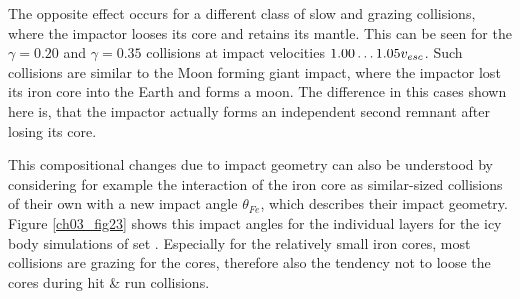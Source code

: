 The opposite effect occurs for a different class of slow and grazing collisions, where the impactor looses its core and retains its mantle. This can be seen for the $\gamma = 0.20$ and $\gamma = 0.35$ collisions at impact velocities $1.00 \dots 1.05 v_{esc}$. Such collisions are similar to the Moon forming giant impact, where the impactor lost its iron core into the Earth and forms a moon. The difference in this cases shown here is, that the impactor actually forms an independent second remnant after losing its core. 

This compositional changes due to impact geometry can also be understood by considering for example the interaction of the iron core as similar-sized collisions of their own with a new impact angle $\theta_{Fe}$, which describes their impact geometry. Figure \ref{ch03_fig23} shows this impact angles for the individual layers for the icy body simulations of set \iss. Especially for the relatively small iron cores, most collisions are grazing for the cores, therefore also the tendency not to loose the cores during hit \& run collisions. 

